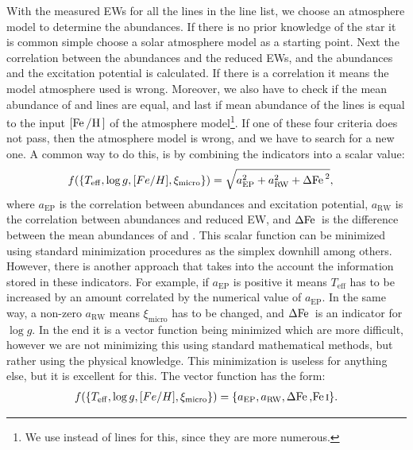 With the measured EWs for all the lines in the line list, we choose an
atmosphere model to determine the abundances. If there is no prior knowledge of
the star it is common simple choose a solar atmosphere model as a starting
point. Next the correlation between the abundances and the reduced EWs, and the
abundances and the excitation potential is calculated. If there is a correlation
it means the model atmosphere used is wrong. Moreover, we also have to check if
the mean abundance of  and  lines are equal, and last if
mean abundance of the  lines is equal to the input
$[\ion{Fe}/\ion{H}]$ of the atmosphere model\footnote{We use  instead
of  lines for this, since they are more numerous.}. If one of these
four criteria does not pass, then the atmosphere model is wrong, and we have to
search for a new one. A common way to do this, is by combining the indicators
into a scalar value:
\begin{align}
  f(\{T_\mathrm{eff}, \log g, [Fe/H], \xi_\mathrm{micro}\}) &= \sqrt{a_\mathrm{EP}^2 + a_\mathrm{RW}^2 + \Delta\ion{Fe}{}^2},
\end{align}
where $a_\mathrm{EP}$ is the correlation between abundances and excitation
potential, $a_\mathrm{RW}$ is the correlation between abundances and reduced EW,
and $\Delta\ion{Fe}{}$ is the difference between the mean abundances of
 and . This scalar function can be minimized using
standard minimization procedures as the simplex downhill among others. However,
there is another approach that takes into the account the information stored in
these indicators. For example, if $a_\mathrm{EP}$ is positive it means
$T_\mathrm{eff}$ has to be increased by an amount correlated by the numerical
value of $a_\mathrm{EP}$. In the same way, a non-zero $a_\mathrm{RW}$ means
$\xi_\mathrm{micro}$ has to be changed, and $\Delta\ion{Fe}{}$ is an indicator
for $\log g$. In the end it is a vector function being minimized which are more
difficult, however we are not minimizing this using standard mathematical
methods, but rather using the physical knowledge. This minimization is useless
for anything else, but it is excellent for this.
The vector function has the form:
\begin{align}
    f(\{T_\mathrm{eff}, \log g, [Fe/H], \xi_\mathrm{micro}\}) = \{a_\mathrm{EP}, a_\mathrm{RW}, \Delta\ion{Fe}, \ion{Fe}{I}\}.
\end{align}

